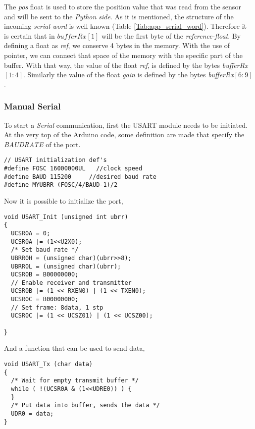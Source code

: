 \noindent The \textit{pos} float is used to store the position value that was read from the sensor and will be sent to the \textit{Python side}. As it is mentioned, the structure of the incoming \textit{serial word} is well known (Table \ref{Tab:app_serial_word}). Therefore it is certain that in \textit{$bufferRx[1]$} will be the first byte of the \textit{reference-float}. By defining a float as \textit{ref}, we conserve 4 bytes in the memory. With the use of pointer, we can connect that space of the memory with the specific part of the buffer. With that way, the value of the float \textit{ref}, is defined by the bytes \textit{bufferRx$[1:4]$}. Similarly the value of the float \textit{gain} is defined by the bytes \textit{bufferRx$[6:9]$}.







\subsubsection{Manual Serial}

To start a \textit{Serial} communication, first the USART module needs to be initiated. At the very top of the Arduino code, some definition are made that specify the \textit{BAUDRATE} of the port.

\begin{lstlisting}[style=My_Arduino, caption=BAUDRATE definitions,label=code:ard:baud]
// USART initialization def's
#define FOSC 16000000UL   //clock speed
#define BAUD 115200     //desired baud rate
#define MYUBRR (FOSC/4/BAUD-1)/2
\end{lstlisting}

\noindent Now it is possible to initialize the port,

\begin{lstlisting}[style=My_Arduino, caption=USART\_Init, label=code:ard:USART init]
void USART_Init (unsigned int ubrr)
{
  UCSR0A = 0;
  UCSR0A |= (1<<U2X0);
  /* Set baud rate */
  UBRR0H = (unsigned char)(ubrr>>8);
  UBRR0L = (unsigned char)(ubrr);
  UCSR0B = B00000000;
  // Enable receiver and transmitter 
  UCSR0B |= (1 << RXEN0) | (1 << TXEN0);
  UCSR0C = B00000000;
  // Set frame: 8data, 1 stp
  UCSR0C |= (1 << UCSZ01) | (1 << UCSZ00);
   
}
\end{lstlisting}

\noindent And a function that can be used to send data,


\begin{lstlisting}[style=My_Arduino,caption=Function to transmit data, label=code:ard:USART tx]
void USART_Tx (char data)
{
  /* Wait for empty transmit buffer */
  while ( !(UCSR0A & (1<<UDRE0)) ) {
  }
  /* Put data into buffer, sends the data */
  UDR0 = data;
}
\end{lstlisting}

